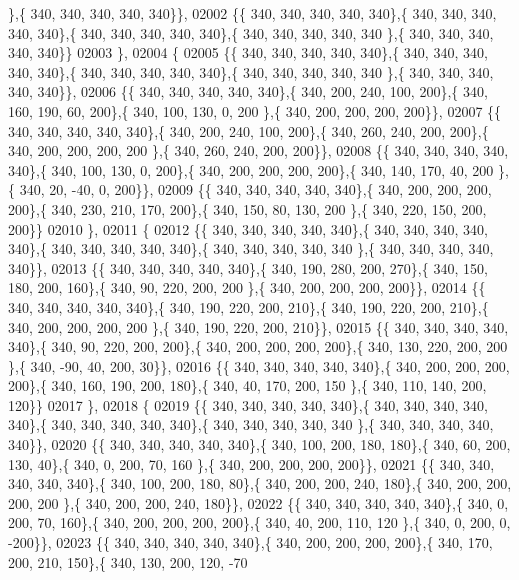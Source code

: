 \begin{DoxyCode}
      \},\{ 340, 340, 340, 340, 340\}\},
02002 \{\{ 340, 340, 340, 340, 340\},\{ 340, 340, 340, 340, 340\},\{ 340, 340, 340, 340, 340\},\{ 340, 340, 340, 340, 340
      \},\{ 340, 340, 340, 340, 340\}\}
02003 \},
02004 \{
02005 \{\{ 340, 340, 340, 340, 340\},\{ 340, 340, 340, 340, 340\},\{ 340, 340, 340, 340, 340\},\{ 340, 340, 340, 340, 340
      \},\{ 340, 340, 340, 340, 340\}\},
02006 \{\{ 340, 340, 340, 340, 340\},\{ 340, 200, 240, 100, 200\},\{ 340, 160, 190,  60, 200\},\{ 340, 100, 130,   0, 200
      \},\{ 340, 200, 200, 200, 200\}\},
02007 \{\{ 340, 340, 340, 340, 340\},\{ 340, 200, 240, 100, 200\},\{ 340, 260, 240, 200, 200\},\{ 340, 200, 200, 200, 200
      \},\{ 340, 260, 240, 200, 200\}\},
02008 \{\{ 340, 340, 340, 340, 340\},\{ 340, 100, 130,   0, 200\},\{ 340, 200, 200, 200, 200\},\{ 340, 140, 170,  40, 200
      \},\{ 340,  20, -40,   0, 200\}\},
02009 \{\{ 340, 340, 340, 340, 340\},\{ 340, 200, 200, 200, 200\},\{ 340, 230, 210, 170, 200\},\{ 340, 150,  80, 130, 200
      \},\{ 340, 220, 150, 200, 200\}\}
02010 \},
02011 \{
02012 \{\{ 340, 340, 340, 340, 340\},\{ 340, 340, 340, 340, 340\},\{ 340, 340, 340, 340, 340\},\{ 340, 340, 340, 340, 340
      \},\{ 340, 340, 340, 340, 340\}\},
02013 \{\{ 340, 340, 340, 340, 340\},\{ 340, 190, 280, 200, 270\},\{ 340, 150, 180, 200, 160\},\{ 340,  90, 220, 200, 200
      \},\{ 340, 200, 200, 200, 200\}\},
02014 \{\{ 340, 340, 340, 340, 340\},\{ 340, 190, 220, 200, 210\},\{ 340, 190, 220, 200, 210\},\{ 340, 200, 200, 200, 200
      \},\{ 340, 190, 220, 200, 210\}\},
02015 \{\{ 340, 340, 340, 340, 340\},\{ 340,  90, 220, 200, 200\},\{ 340, 200, 200, 200, 200\},\{ 340, 130, 220, 200, 200
      \},\{ 340, -90,  40, 200,  30\}\},
02016 \{\{ 340, 340, 340, 340, 340\},\{ 340, 200, 200, 200, 200\},\{ 340, 160, 190, 200, 180\},\{ 340,  40, 170, 200, 150
      \},\{ 340, 110, 140, 200, 120\}\}
02017 \},
02018 \{
02019 \{\{ 340, 340, 340, 340, 340\},\{ 340, 340, 340, 340, 340\},\{ 340, 340, 340, 340, 340\},\{ 340, 340, 340, 340, 340
      \},\{ 340, 340, 340, 340, 340\}\},
02020 \{\{ 340, 340, 340, 340, 340\},\{ 340, 100, 200, 180, 180\},\{ 340,  60, 200, 130,  40\},\{ 340,   0, 200,  70, 160
      \},\{ 340, 200, 200, 200, 200\}\},
02021 \{\{ 340, 340, 340, 340, 340\},\{ 340, 100, 200, 180,  80\},\{ 340, 200, 200, 240, 180\},\{ 340, 200, 200, 200, 200
      \},\{ 340, 200, 200, 240, 180\}\},
02022 \{\{ 340, 340, 340, 340, 340\},\{ 340,   0, 200,  70, 160\},\{ 340, 200, 200, 200, 200\},\{ 340,  40, 200, 110, 120
      \},\{ 340,   0, 200,   0, -200\}\},
02023 \{\{ 340, 340, 340, 340, 340\},\{ 340, 200, 200, 200, 200\},\{ 340, 170, 200, 210, 150\},\{ 340, 130, 200, 120, -70

\end{DoxyCode}
